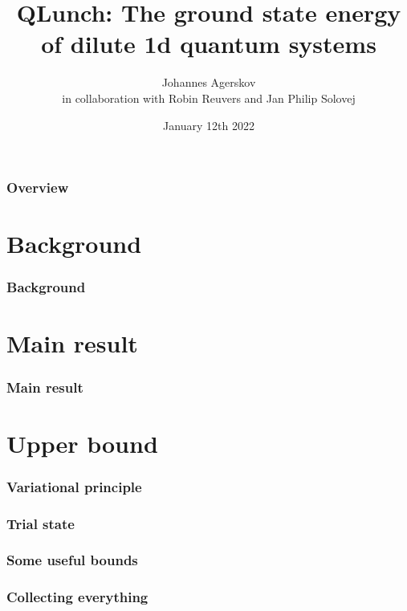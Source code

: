 \documentclass{beamer}[10]
\title{QLunch: The ground state energy of dilute 1d quantum systems}
\subtitle{}
\author{Johannes Agerskov\\\vspace{0.2 cm}
	\scriptsize{in collaboration with Robin Reuvers and Jan Philip Solovej}}
\institute{QMATH \\ University of Copenhagen}
\date{January 12th 2022}
\begin{document}
\frame{\titlepage \vspace{-0.5cm}
}

\frame
{
\frametitle{Overview}
\tableofcontents%
}

\section{Background}

\begin{frame}
\frametitle{Background}
\begin{block}{}
	
\end{block}	
\end{frame}


\section{Main result}

\begin{frame}
	\frametitle{Main result}
	\begin{block}{}
		
	\end{block}	
\end{frame}



\section{Upper bound}

\begin{frame}
	\frametitle{Variational principle}
	\begin{block}{}
		
	\end{block}	
\end{frame}

\begin{frame}
	\frametitle{Trial state}
	\begin{block}{}
		
	\end{block}	
\end{frame}

\begin{frame}
	\frametitle{Some useful bounds}
	\begin{block}{}
		
	\end{block}	
\end{frame}

\begin{frame}
	\frametitle{Collecting everything}
	\begin{block}{}
		
	\end{block}	
\end{frame}
\end{document}
